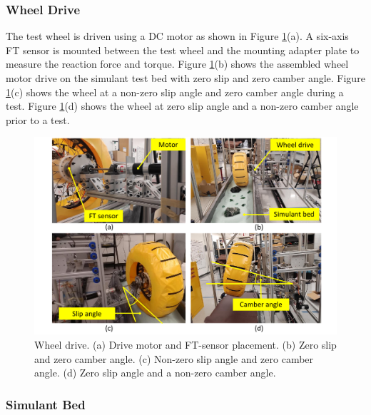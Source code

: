 \documentclass{article}
\begin{document}
\subsubsection{Wheel Drive}

The test wheel is driven using a DC motor as shown in Figure \ref{fig:wheel-drive}(a). A six-axis FT sensor is mounted between the test wheel and the mounting adapter plate to measure the reaction force and torque. Figure \ref{fig:wheel-drive}(b) shows the assembled wheel motor drive on the simulant test bed with zero slip and zero camber angle. Figure \ref{fig:wheel-drive}(c) shows the wheel at a non-zero slip angle and zero camber angle during a test. Figure \ref{fig:wheel-drive}(d) shows the wheel at zero slip angle and a non-zero camber angle prior to a test.
\label{subsubsec:wheel-drive}
\begin{figure}[hbt!]
\centering
\includegraphics[width=6.00in]{test-rig-images/wheel-drive.pdf}
\caption{Wheel drive. (a) Drive motor and FT-sensor placement. (b) Zero slip and zero camber angle. (c) Non-zero slip angle and zero camber angle. (d) Zero slip angle and a non-zero camber angle.}
\label{fig:wheel-drive}
\end{figure}


\subsubsection{Simulant Bed}
\label{subsubsec:simulant-bed}
\end{document}
